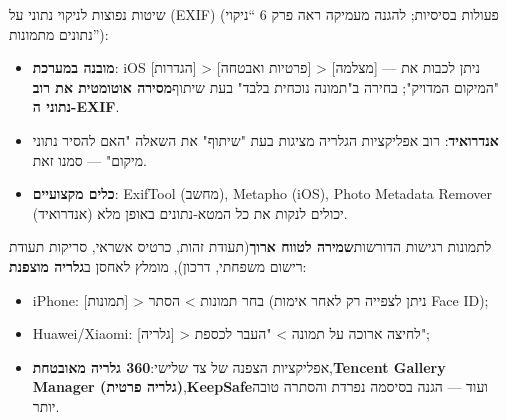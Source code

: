 שיטות נפוצות לניקוי נתוני על (EXIF) (פעולות בסיסיות; להגנה מעמיקה ראה פרק 6 “ניקוי נתונים מתמונות”):

\begin{itemize}
  \item \textbf{מובנה במערכת}: iOS [הגדרות] > [פרטיות ואבטחה] > [מצלמה] — ניתן לכבות את "המיקום המדויק"; בחירה ב"תמונה נוכחית בלבד" בעת שיתוף\textbf{מסירה אוטומטית את רוב נתוני ה-EXIF}.
  \item \textbf{אנדרואיד}: רוב אפליקציות הגלריה מציגות בעת "שיתוף" את השאלה "האם להסיר נתוני מיקום" — סמנו זאת.
  \item \textbf{כלים מקצועיים}: ExifTool (מחשב), Metapho (iOS), Photo Metadata Remover (אנדרואיד) יכולים לנקות את כל המטא-נתונים באופן מלא.
\end{itemize}

לתמונות רגישות הדורשות\textbf{שמירה לטווח ארוך}(תעודת זהות, כרטיס אשראי, סריקות תעודת רישום משפחתי, דרכון), מומלץ לאחסן ב\textbf{גלריה מוצפנת}:

\begin{itemize}
  \item iPhone: [תמונות] > בחר תמונות > הסתר (ניתן לצפייה רק לאחר אימות Face ID);
  \item Huawei/Xiaomi: [גלריה] > לחיצה ארוכה על תמונה > "העבר לכספת";
  \item אפליקציות הצפנה של צד שלישי:\textbf{360 גלריה מאובטחת},\textbf{Tencent Gallery Manager (גלריה פרטית)},\textbf{KeepSafe}ועוד — הגנה בסיסמה נפרדת והסתרה טובה יותר.
\end{itemize}
